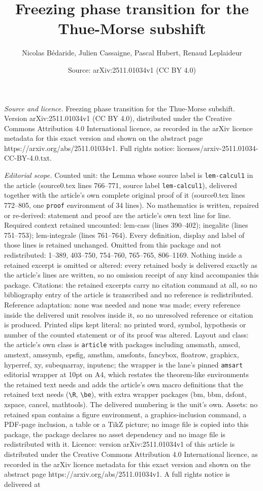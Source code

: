 \documentclass[10pt,a4paper]{amsart}
\title[Freezing phase transition for the Thue-Morse subshift]{Freezing phase transition for the Thue-Morse subshift}
\author{Nicolas B\'edaride, Julien Cassaigne, Pascal Hubert, Renaud Leplaideur}
\date{Source: arXiv:2511.01034v1 (CC BY 4.0)}
\begin{document}
\maketitle

\noindent\emph{Source and licence.} Freezing phase transition for the Thue-Morse subshift. Version arXiv:2511.01034v1 (CC BY 4.0), distributed under the Creative Commons Attribution 4.0 International licence, as recorded in the arXiv licence metadata for this exact version and shown on the abstract page https://arxiv.org/abs/2511.01034v1. Full rights notice: licenses/arxiv-2511.01034-CC-BY-4.0.txt.\par\smallskip

\noindent\textit{Editorial scope.} Counted unit: the Lemma whose source label is \texttt{lem-calcul1} in the article (source0.tex lines 766--771, source label \texttt{lem-calcul1}), delivered together with the article's own complete original proof of it (source0.tex lines 772--805, one \texttt{proof} environment of 34 lines). No mathematics is written, repaired or re-derived: statement and proof are the article's own text line for line. Required context retained uncounted: lem-cass (lines 390--402); inegalite (lines 751--753); lem-integrale (lines 761--764). Every definition, display and label of those lines is retained unchanged. Omitted from this package and not redistributed: 1--389, 403--750, 754--760, 765--765, 806--1169. Nothing inside a retained excerpt is omitted or altered: every retained body is delivered exactly as the article's lines are written, so no omission receipt of any kind accompanies this package. Citations: the retained excerpts carry no citation command at all, so no bibliography entry of the article is transcribed and no reference is redistributed. Reference adaptation: none was needed and none was made; every reference inside the delivered unit resolves inside it, so no unresolved reference or citation is produced. Printed slips kept literal: no printed word, symbol, hypothesis or number of the counted statement or of its proof was altered. Layout and class: the article's own class is \texttt{article} with packages including amsmath, amscd, amstext, amssymb, epsfig, amsthm, amsfonts, fancybox, floatrow, graphicx, hyperref, xy, subeqnarray, inputenc; the wrapper is the lane's pinned \texttt{amsart} editorial wrapper at 10pt on A4, which restates the theorem-like environments the retained text needs and adds the article's own macro definitions that the retained text needs (\texttt{\textbackslash R}, \texttt{\textbackslash be}), with extra wrapper packages (bm, bbm, dsfont, xspace, cancel, mathtools). The delivered numbering is the unit's own. Assets: no retained span contains a figure environment, a graphics-inclusion command, a PDF-page inclusion, a table or a TikZ picture; no image file is copied into this package, the package declares no asset dependency and no image file is redistributed with it. Licence: version arXiv:2511.01034v1 of this article is distributed under the Creative Commons Attribution 4.0 International licence, as recorded in the arXiv licence metadata for this exact version and shown on the abstract page https://arxiv.org/abs/2511.01034v1. A full rights notice is delivered at 
\end{document}
